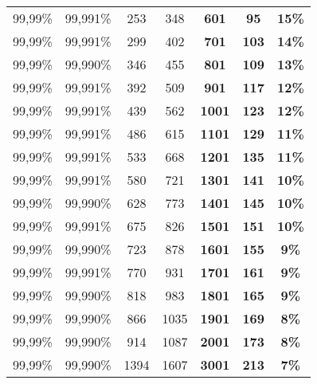 \begin{table}[]
{\begin{tabular}{cccc
>{\columncolor[HTML]{8D3CE1}}c 
>{\columncolor[HTML]{5754D6}}c 
>{\columncolor[HTML]{8FFFFB}}c }
\cellcolor[HTML]{C0C0C0}99,99\% & \cellcolor[HTML]{C0C0C0}99,991\% & \cellcolor[HTML]{C0C0C0}253 & \cellcolor[HTML]{C0C0C0}348 & \textbf{601} & \textbf{95} & \textbf{15\%} \\
99,99\% & 99,991\% & 299 & 402 & \textbf{701} & \textbf{103} & \textbf{14\%} \\
\cellcolor[HTML]{C0C0C0}99,99\% & \cellcolor[HTML]{C0C0C0}99,990\% & \cellcolor[HTML]{C0C0C0}346 & \cellcolor[HTML]{C0C0C0}455 & \textbf{801} & \textbf{109} & \textbf{13\%} \\
99,99\% & 99,991\% & 392 & 509 & \textbf{901} & \textbf{117} & \textbf{12\%} \\
\cellcolor[HTML]{C0C0C0}99,99\% & \cellcolor[HTML]{C0C0C0}99,991\% & \cellcolor[HTML]{C0C0C0}439 & \cellcolor[HTML]{C0C0C0}562 & \textbf{1001} & \textbf{123} & \textbf{12\%} \\
99,99\% & 99,991\% & 486 & 615 & \textbf{1101} & \textbf{129} & \textbf{11\%} \\
\cellcolor[HTML]{C0C0C0}99,99\% & \cellcolor[HTML]{C0C0C0}99,991\% & \cellcolor[HTML]{C0C0C0}533 & \cellcolor[HTML]{C0C0C0}668 & \textbf{1201} & \textbf{135} & \textbf{11\%} \\
99,99\% & 99,991\% & 580 & 721 & \textbf{1301} & \textbf{141} & \textbf{10\%} \\
\cellcolor[HTML]{C0C0C0}99,99\% & \cellcolor[HTML]{C0C0C0}99,990\% & \cellcolor[HTML]{C0C0C0}628 & \cellcolor[HTML]{C0C0C0}773 & \textbf{1401} & \textbf{145} & \textbf{10\%} \\
99,99\% & 99,991\% & 675 & 826 & \textbf{1501} & \textbf{151} & \textbf{10\%} \\
\cellcolor[HTML]{C0C0C0}99,99\% & \cellcolor[HTML]{C0C0C0}99,990\% & \cellcolor[HTML]{C0C0C0}723 & \cellcolor[HTML]{C0C0C0}878 & \textbf{1601} & \textbf{155} & \textbf{9\%} \\
99,99\% & 99,991\% & 770 & 931 & \textbf{1701} & \textbf{161} & \textbf{9\%} \\
\cellcolor[HTML]{C0C0C0}99,99\% & \cellcolor[HTML]{C0C0C0}99,990\% & \cellcolor[HTML]{C0C0C0}818 & \cellcolor[HTML]{C0C0C0}983 & \textbf{1801} & \textbf{165} & \textbf{9\%} \\
99,99\% & 99,990\% & 866 & 1035 & \textbf{1901} & \textbf{169} & \textbf{8\%} \\
\cellcolor[HTML]{C0C0C0}99,99\% & \cellcolor[HTML]{C0C0C0}99,990\% & \cellcolor[HTML]{C0C0C0}914 & \cellcolor[HTML]{C0C0C0}1087 & \textbf{2001} & \textbf{173} & \textbf{8\%} \\
99,99\% & 99,990\% & 1394 & 1607 & \textbf{3001} & \textbf{213} & \textbf{7\%} \\

\end{tabular}}
\end{table}
